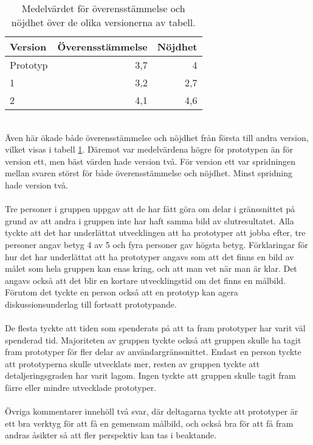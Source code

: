 \begin{table}[h!]
	\caption{Medelvärdet för överensstämmelse och nöjdhet över de olika versionerna av tabell.}
  \def\arraystretch{1.5}
  \begin{adjustbox}{max width=\textwidth}
    \begin{tabularx}{\textwidth}{ | X | r | r |}
      \hline
      \textbf{Version} & \textbf{Överensstämmelse} & \textbf{Nöjdhet} \\
      \hline
      Prototyp & 3,7 & 4 \\
      \hline
      1 & 3,2 & 2,7 \\
      \hline 
      2 & 4,1 & 4,6 \\
      \hline 
    \end{tabularx}
  \end{adjustbox}
  \label{tab:medelvarde_tabell}
\end{table}
\ \\
Även här ökade både överensstämmelse och nöjdhet från första till andra version, vilket visas i tabell \ref{tab:medelvarde_tabell}. Däremot var medelvärdena högre för prototypen än för version ett, men bäst värden hade version två. För version ett var spridningen mellan svaren störst för både överensstämmelse och nöjdhet. Minst spridning hade version två. 
\\ \\
Tre personer i gruppen uppgav att de har fått göra om delar i gränssnittet på grund av att andra i gruppen inte har haft samma bild av slutresultatet. Alla tyckte att det har underlättat utvecklingen att ha prototyper att jobba efter, tre personer angav betyg 4 av 5 och fyra personer gav högsta betyg.
Förklaringar för hur det har underlättat att ha prototyper angavs som att det finns en bild av målet som hela gruppen kan enas kring, och att man vet när man är klar. Det angavs också att det blir en kortare utvecklingstid om det finns en målbild. Förutom det tyckte en person också att en prototyp kan agera diskussionsunderlag till fortsatt prototypande. 
\\ \\
De flesta tyckte att tiden som spenderats på att ta fram prototyper har varit väl spenderad tid. Majoriteten av gruppen tyckte också att gruppen skulle ha tagit fram prototyper för fler delar av användargränssnittet. Endast en person tyckte att prototyperna skulle utvecklats mer, resten av gruppen tyckte att detaljeringsgraden har varit lagom. Ingen tyckte att gruppen skulle tagit fram färre eller mindre utvecklade prototyper. 
\\ \\
Övriga kommentarer innehöll två svar, där deltagarna tyckte att prototyper är ett bra verktyg för att få en gemensam målbild, och också bra för att få fram andras åsikter så att fler perspektiv kan tas i beaktande.

